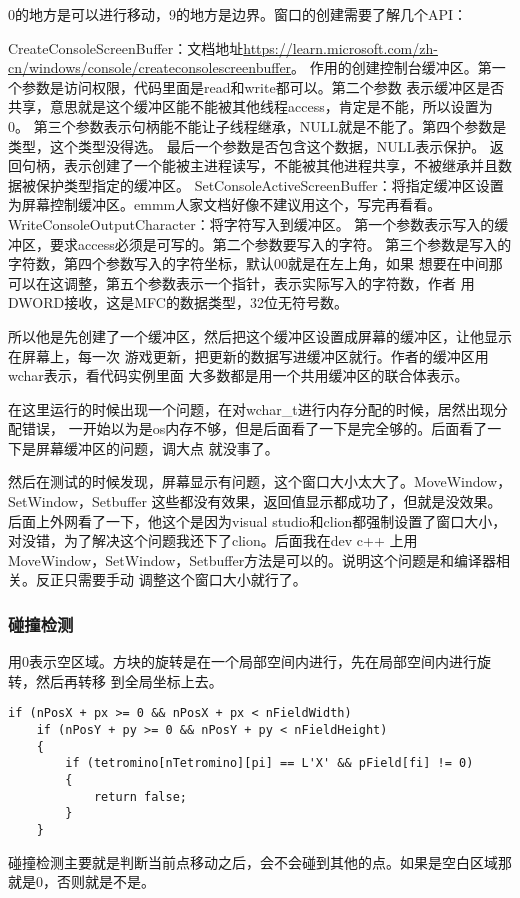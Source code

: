 \documentclass{article}
\begin{document}
\begin{sloppypar}
\begin{lstlisting}
\end{lstlisting}
0的地方是可以进行移动，9的地方是边界。窗口的创建需要了解几个API：
\begin{outline}
	\1 CreateConsoleScreenBuffer：文档地址\url{https://learn.microsoft.com/zh-cn/windows/console/createconsolescreenbuffer}。
		\2 作用的创建控制台缓冲区。第一个参数是访问权限，代码里面是read和write都可以。第二个参数
		表示缓冲区是否共享，意思就是这个缓冲区能不能被其他线程access，肯定是不能，所以设置为0。
		第三个参数表示句柄能不能让子线程继承，NULL就是不能了。第四个参数是类型，这个类型没得选。
		最后一个参数是否包含这个数据，NULL表示保护。
		\2 返回句柄，表示创建了一个能被主进程读写，不能被其他进程共享，不被继承并且数据被保护类型指定的缓冲区。
    \1 SetConsoleActiveScreenBuffer：将指定缓冲区设置为屏幕控制缓冲区。emmm人家文档好像不建议用这个，写完再看看。
	\1 WriteConsoleOutputCharacter：将字符写入到缓冲区。
		\2 第一个参数表示写入的缓冲区，要求access必须是可写的。第二个参数要写入的字符。
		第三个参数是写入的字符数，第四个参数写入的字符坐标，默认00就是在左上角，如果
		想要在中间那可以在这调整，第五个参数表示一个指针，表示实际写入的字符数，作者
		用DWORD接收，这是MFC的数据类型，32位无符号数。
\end{outline}
所以他是先创建了一个缓冲区，然后把这个缓冲区设置成屏幕的缓冲区，让他显示在屏幕上，每一次
游戏更新，把更新的数据写进缓冲区就行。作者的缓冲区用wchar表示，看代码实例里面
大多数都是用一个共用缓冲区的联合体表示。

在这里运行的时候出现一个问题，在对wchar\_t进行内存分配的时候，居然出现分配错误，
一开始以为是os内存不够，但是后面看了一下是完全够的。后面看了一下是屏幕缓冲区的问题，调大点
就没事了。

然后在测试的时候发现，屏幕显示有问题，这个窗口大小太大了。MoveWindow，SetWindow，Setbuffer
这些都没有效果，返回值显示都成功了，但就是没效果。后面上外网看了一下，他这个是因为visual 
studio和clion都强制设置了窗口大小，对没错，为了解决这个问题我还下了clion。后面我在dev c++
上用MoveWindow，SetWindow，Setbuffer方法是可以的。说明这个问题是和编译器相关。反正只需要手动
调整这个窗口大小就行了。

\subsubsection{碰撞检测}
用0表示空区域。方块的旋转是在一个局部空间内进行，先在局部空间内进行旋转，然后再转移
到全局坐标上去。
\begin{lstlisting}
if (nPosX + px >= 0 && nPosX + px < nFieldWidth)
	if (nPosY + py >= 0 && nPosY + py < nFieldHeight)
	{
		if (tetromino[nTetromino][pi] == L'X' && pField[fi] != 0)
		{
			return false;
		}
	}
\end{lstlisting}
碰撞检测主要就是判断当前点移动之后，会不会碰到其他的点。如果是空白区域那就是0，否则就是不是。


\end{sloppypar}
\end{document}
